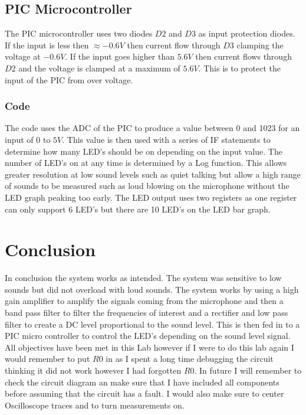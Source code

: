 \documentclass[10pt,a4paper]{article}
\begin{document}
\subsection{PIC Microcontroller} 
The PIC microcontroller uses two diodes $D2$ and $D3$ as input protection diodes. If the input is less then $\approx -0.6V$ then current flow through $D3$ clamping the voltage at $-0.6V$. If the input goes higher than $5.6V$ then current flows through $D2$ and the voltage is clamped at a maximum of $5.6V$. This is to protect the input  of the PIC from over voltage.
\subsubsection{Code}
The code uses the ADC of the PIC to produce a value between 0 and 1023 for an input of 0 to $5V$. This value is then used with a series of IF statements to determine how many LED's should be on depending on the input value. The number of LED's on at any time is determined by a Log function. This allows greater resolution at low sound levels such as quiet talking but allow a high range of sounds to be measured such as loud blowing on the microphone without the LED graph peaking too early. The LED output uses two registers as one register can only support 6 LED's but there are 10 LED's on the LED bar graph.  


\section{Conclusion}
In conclusion the system works as intended. The system was sensitive to low sounds but did not overload with loud sounds. The system works by using a high gain amplifier to amplify the signals coming from the microphone and then a band pass filter to filter the frequencies of interest and a rectifier and low pass filter to create a DC level proportional to the sound level. This is then fed in to a PIC micro controller to control the LED's depending on the sound level signal. All objectives have been met in this Lab however if I were to do this lab again I would remember to put $R0$ in as I spent a long time debugging the circuit thinking it did not work however I had forgotten $R0$. In future I will remember to check the circuit diagram an make sure that I have included all components before assuming that the circuit has a fault. I would also make sure to center Oscilloscope traces and to turn measurements on.   
\end{document}
